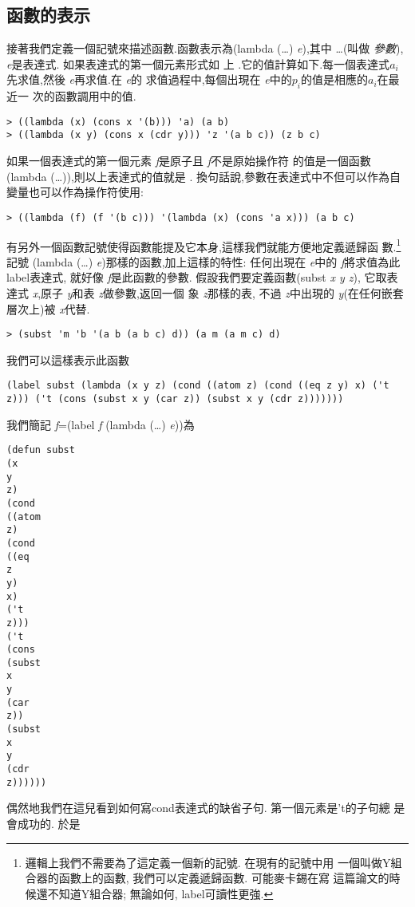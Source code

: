\documentclass[12pt,a4]{article}
\begin{document}
\begin{CJK}{UTF8}{bsmi}
\section{函數的表示} 
接著我們定義一個記號來描述函數.函數表示為(lambda 
(\pone\dots\pn) 
{\it 
e}),其中 
\pone\dots{}(叫做{\em 
參數}),{\it 
e}是表達式. 
如果表達式的第一個元素形式如 
上 
.它的值計算如下.每一個表達式{$a_{i}$}先求值,然後{\it 
e}再求值.在{\it 
e}的 
求值過程中,每個出現在{\it 
e}中的{$p_{i}$}的值是相應的{$a_{i}$}在最近一 
次的函數調用中的值. 
\begin{verbatim} 
> ((lambda (x) (cons x '(b))) 'a) (a b) 
> ((lambda (x y) (cons x (cdr y))) 'z '(a b c)) (z b c) 
\end{verbatim} 
如果一個表達式的第一個元素{\it 
f}是原子且{\it 
f}不是原始操作符 
的值是一個函數(lambda 
(\pone\dots\pn)),則以上表達式的值就是 
. 
換句話說,參數在表達式中不但可以作為自變量也可以作為操作符使用: 
\begin{verbatim} 
> ((lambda (f) (f '(b c))) '(lambda (x) (cons 'a x))) (a b c) 
\end{verbatim} 
有另外一個函數記號使得函數能提及它本身,這樣我們就能方便地定義遞歸函 
數.\footnote{邏輯上我們不需要為了這定義一個新的記號. 
在現有的記號中用 
一個叫做Y組合器的函數上的函數, 
我們可以定義遞歸函數. 
可能麥卡錫在寫 
這篇論文的時候還不知道Y組合器; 
無論如何, 
label可讀性更強.} 
記號 
(lambda 
(\pone\dots\pn) 
{\it 
e})那樣的函數,加上這樣的特性: 
任何出現在{\it 
e}中的{\it 
f}將求值為此label表達式, 
就好像{\it 
f}是此函數的參數. 
假設我們要定義函數(subst 
{\it 
x 
y 
z}), 
它取表達式{\it 
x},原子{\it 
y}和表{\it 
z}做參數,返回一個 
象{\it 
z}那樣的表, 
不過{\it 
z}中出現的{\it 
y}(在任何嵌套層次上)被{\it 
x}代替. 
\begin{verbatim} 
> (subst 'm 'b '(a b (a b c) d)) (a m (a m c) d) 
\end{verbatim} 
我們可以這樣表示此函數 
\begin{verbatim} 
(label subst (lambda (x y z) (cond ((atom z) (cond ((eq z y) x) ('t z))) ('t (cons (subst x y (car z)) (subst x y (cdr z))))))) 
\end{verbatim} 
我們簡記{\it 
f}=(label 
{\it 
f} 
(lambda 
(\pone\dots\pn) 
{\it 
e}))為 
\begin{verbatim} 
(defun subst 
(x 
y 
z) 
(cond 
((atom 
z) 
(cond 
((eq 
z 
y) 
x) 
('t 
z))) 
('t 
(cons 
(subst 
x 
y 
(car 
z)) 
(subst 
x 
y 
(cdr 
z)))))) 
\end{verbatim} 
偶然地我們在這兒看到如何寫cond表達式的缺省子句. 
第一個元素是't的子句總 
是會成功的. 
於是 

\end{CJK}
\end{document}
